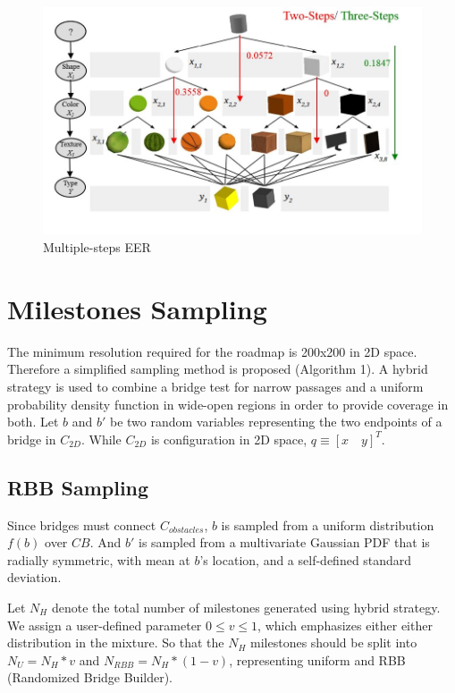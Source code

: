 \documentclass[12pt,draftcls,onecolumn]{IEEEtran}
\begin{document}
\begin{figure}
 \centering
  \includegraphics[width=15cm]{figures/someStepEER}
  \caption{Multiple-steps EER}
  \label{fig:14}
\end{figure}


\clearpage
\section{Milestones Sampling}
The minimum resolution required for the roadmap is 200x200 in 2D space. 
Therefore a simplified sampling method is proposed (Algorithm 1).
A hybrid strategy is used to combine a bridge test for narrow passages and a uniform probability density function in wide-open regions in order to provide coverage in both.
Let $b$ and $b'$ be two random variables representing the two endpoints of a bridge in $C_{2D}$.
While $C_{2D}$ is configuration in 2D space,  $q \equiv [x  \quad  y  ]^T$.


\subsection{RBB Sampling}
Since bridges must connect $C_{obstacles}$, $b$ is sampled from a uniform distribution $f(b)$ over $CB$.
And $b'$ is sampled from a multivariate Gaussian PDF that is radially symmetric, with mean at $b$'s location, and a self-defined standard deviation.



Let $N_{H}$ denote the total number of milestones generated using hybrid strategy.
We assign a user-defined parameter $0\leq v \leq 1$, which emphasizes either either distribution in the mixture.
So that the $N_{H}$  milestones should be split into  $N_{U} =N_{H}*v $ and $N_{RBB} =N_{H}*(1-v) $, representing uniform and RBB (Randomized Bridge Builder).
\end{document}
